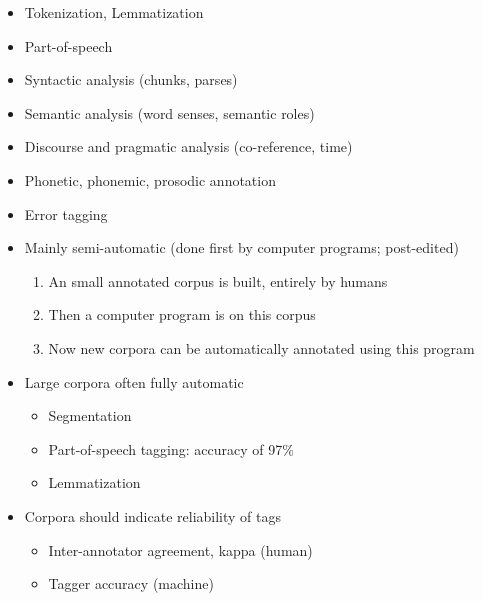 \documentclass[a4paper,landscape,headrule,footrule,dvips]{foils}
\begin{document}
\begin{CJK}{UTF8}{min}
\begin{itemize}
\item  Tokenization, Lemmatization
\item  Part-of-speech
\item  Syntactic analysis (chunks, parses)
\item  Semantic analysis  (word senses, semantic roles)
\item  Discourse and pragmatic analysis (co-reference, time)
\item  Phonetic, phonemic, prosodic annotation
\item  Error tagging
\end{itemize}

\begin{itemize}
\item Mainly semi-automatic (done first by computer programs; post-edited)
 \begin{enumerate}
  \item An small annotated corpus is built, entirely by humans
  \item Then a computer program is  on this corpus
  \item Now new corpora can be automatically annotated using this program
  \end{enumerate}
\item Large corpora often fully automatic
  \begin{itemize}
  \item Segmentation
  \item Part-of-speech tagging: accuracy of 97\%
  \item Lemmatization
  \end{itemize}
\item Corpora should indicate reliability of tags
  \begin{itemize}
  \item Inter-annotator agreement, kappa (human)
  \item Tagger accuracy (machine)
  \end{itemize}
  
\end{itemize}




\end{CJK}
\end{document}
